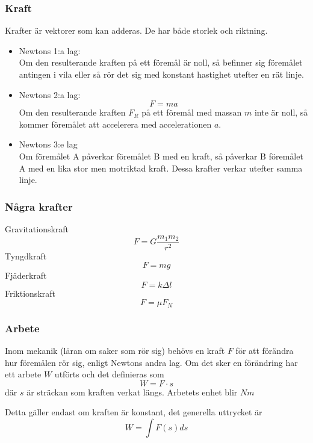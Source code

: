 \documentclass[11pt]{beamer}
\begin{document}
    \begin{frame}
        \frametitle{Kraft}
        Krafter är vektorer som kan adderas.
        De har både storlek och riktning.
        \begin{itemize}
            \item Newtons 1:a lag: \\
            Om den resulterande kraften på ett föremål är noll, så befinner sig föremålet antingen i vila eller så rör det sig med konstant hastighet utefter en rät linje.
            \item Newtons 2:a lag:
            \begin{equation}
                F=m a
            \end{equation}
            Om den resulterande kraften $F_R$ på ett föremål med massan $m$ inte är noll, så kommer föremålet att accelerera med accelerationen $a$.
            \item Newtons 3:e lag \\
            Om föremålet A påverkar föremålet B med en kraft, så påverkar B föremålet A med en lika stor men motriktad kraft. Dessa krafter verkar utefter samma linje.
        \end{itemize}
    \end{frame}
    \begin{frame}
        \frametitle{Några krafter}
        Gravitationskraft
        \begin{equation}
            F=G \frac{m_1 m_2}{r^2}
        \end{equation}
        Tyngdkraft
        \begin{equation}
            F=m g
        \end{equation}
        Fjäderkraft
        \begin{equation}
            F=k \Delta l
        \end{equation}
        Friktionskraft
        \begin{equation}
            F=\mu F_N
        \end{equation}


    \end{frame}

        \begin{frame}
        \frametitle{Arbete}
        Inom mekanik (läran om saker som rör sig) behövs en kraft $F$ för att förändra hur föremålen rör sig, enligt Newtons andra lag.
        Om det sker en förändring har ett arbete $W$ utförts och det definieras som
        \begin{equation}
            W = F \cdot s
        \end{equation}
        där $s$ är sträckan som kraften verkat längs. Arbetets enhet blir $Nm$

        \vspace{10}
        Detta gäller endast om kraften är konstant, det generella uttrycket är
        \begin{equation}
            W = \int F(s) ds
        \end{equation}

    \end{frame}
\end{document}

